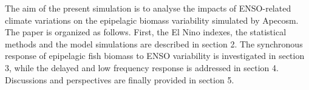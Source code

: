 The aim of the present simulation is to analyse the impacts of ENSO-related climate variations on the epipelagic biomass variability simulated by Apecosm. The paper is organized as follows. First, the El Nino indexes, the statistical methods and the model simulations are described in section 2. The synchronous response of epipelagic fish biomass to ENSO variability is investigated in section 3, while the delayed and low frequency response is addressed in section 4. Discussions and perspectives are finally provided in section 5.

%
